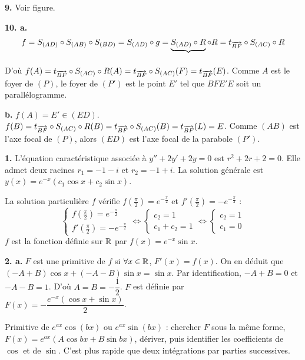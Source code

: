 \documentclass[11pt]{article}
\begin{document}
\textbf{9.} Voir figure.

\textbf{10. a.}
\begin{align*}
f = S_{(AD)} \circ S_{(AB)} \circ S_{(BD)} = S_{(AD)} \circ g = \underbrace{S_{(AD)} \circ R}_{} \circ R = t_{\overrightarrow{BF}} \circ S_{(AC)} \circ R
\end{align*}
D'où $f(A) = t_{\overrightarrow{BF}} \circ S_{(AC)} \circ R(A) = t_{\overrightarrow{BF}} \circ S_{(AC)}(F) = t_{\overrightarrow{BF}}(E)$. Comme $A$ est le foyer de $(P)$, le foyer de $(P')$ est le point $E'$ tel que $BFE'E$ soit un parallélogramme.

\textbf{b.} $f(A) = E' \in (ED)$. $f(B) = t_{\overrightarrow{BF}} \circ S_{(AC)} \circ R(B) = t_{\overrightarrow{BF}} \circ S_{(AC)}(B) = t_{\overrightarrow{BF}}(L) = E$. Comme $(AB)$ est l'axe focal de $(P)$, alors $(ED)$ est l'axe focal de la parabole $(P')$.


\textbf{1.} L'équation caractéristique associée à $y'' + 2y' + 2y = 0$ est $r^2 + 2r + 2 = 0$. Elle admet deux racines $r_1 = -1 - i$ et $r_2 = -1 + i$. La solution générale est $y(x) = e^{-x}(c_1\cos x + c_2\sin x)$.

La solution particulière $f$ vérifie $f\!\left(\tfrac{\pi}{2}\right) = e^{-\frac{\pi}{2}}$ et $f'\!\left(\tfrac{\pi}{2}\right) = -e^{-\frac{\pi}{2}}$ :
\[ \begin{cases} f\!\left(\tfrac{\pi}{2}\right) = e^{-\frac{\pi}{2}} \\ f'\!\left(\tfrac{\pi}{2}\right) = -e^{-\frac{\pi}{2}} \end{cases} \Longleftrightarrow \begin{cases} c_2 = 1 \\ c_1 + c_2 = 1 \end{cases} \Longleftrightarrow \begin{cases} c_2 = 1 \\ c_1 = 0 \end{cases} \]
$f$ est la fonction définie sur $\mathbb{R}$ par $f(x) = e^{-x}\sin x$.

\textbf{2. a.} $F$ est une primitive de $f$ si $\forall x \in \mathbb{R}$, $F'(x) = f(x)$. On en déduit que $(-A + B)\cos x + (-A - B)\sin x = \sin x$. Par identification, $-A + B = 0$ et $-A - B = 1$. D'où $A = B = -\dfrac{1}{2}$. $F$ est définie par $F(x) = -\dfrac{e^{-x}(\cos x + \sin x)}{2}$.

\begin{methode}
Primitive de $e^{ax}\cos(bx)$ ou $e^{ax}\sin(bx)$ : chercher $F$ sous
la même forme, $F(x) = e^{ax}(A\cos bx + B\sin bx)$, dériver, puis
identifier les coefficients de $\cos$ et de $\sin$. C'est plus rapide
que deux intégrations par parties successives.
\end{methode}
\end{document}
